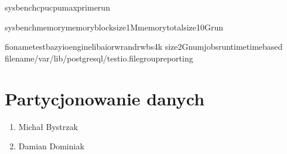 \documentclass[letterpaper,10pt,polish]{sphinxmanual}
\begin{document}
\begin{sphinxVerbatim}[commandchars=\\\{\}]
sysbenchcpu\PYGZhy{}\PYGZhy{}cpu\PYGZhy{}max\PYGZhy{}primerun

sysbenchmemory\PYGZhy{}\PYGZhy{}memory\PYGZhy{}block\PYGZhy{}size1M\PYGZhy{}\PYGZhy{}memory\PYGZhy{}total\PYGZhy{}size10Grun

fio\PYGZhy{}\PYGZhy{}nametest\PYGZus{}bazy\PYGZhy{}\PYGZhy{}ioenginelibaio\PYGZhy{}\PYGZhy{}rwrandrw\PYGZhy{}\PYGZhy{}bs4k
\PYGZhy{}\PYGZhy{}size2G\PYGZhy{}\PYGZhy{}numjobs\PYGZhy{}\PYGZhy{}runtime\PYGZhy{}\PYGZhy{}time\PYGZus{}based
\PYGZhy{}\PYGZhy{}filename/var/lib/postgresql/test\PYGZus{}io.file\PYGZhy{}\PYGZhy{}group\PYGZus{}reporting
\end{sphinxVerbatim}

\sphinxstepscope


\section{Partycjonowanie danych}
\label{\detokenize{rozdzia_u0142_2/rozdzia_u0142_26/index:partycjonowanie-danych}}\label{\detokenize{rozdzia_u0142_2/rozdzia_u0142_26/index::doc}}
\sphinxAtStartPar
{}
\begin{enumerate}
%
\item {} 
\sphinxAtStartPar
Michał Bystrzak

\item {} 
\sphinxAtStartPar
Damian Dominiak

\end{enumerate}
\end{document}
